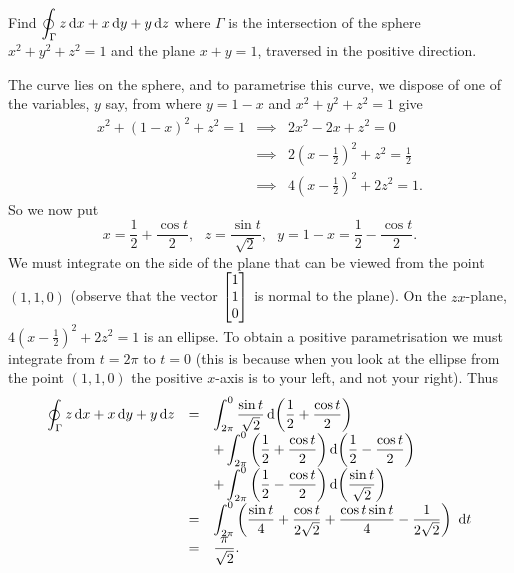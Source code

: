 \begin{multicols}{2}
\begin{problem}
\begin{answer}
\end{answer}
\end{problem}
\begin{problem}
Find $\doint _\Gamma  z\d{x} + x\d{y} + y\d{z}$ where $\Gamma$ is the
intersection of the sphere $x^2 + y^2 + z^2 = 1$ and the plane $x +
y = 1$, traversed in the positive direction. \begin{answer} The
curve lies on the sphere, and to parametrise this curve, we dispose
of one of the variables, $y$ say, from where $y = 1-x$ and $x^2 +
y^2 + z^2 = 1$ give
$$\begin{array}{lll}x^2 + (1 - x)^2 + z^2 = 1  & \implies & 2x^2 -2x + z^2 = 0\\ & \implies & 2\left(x - \frac{1}{2}\right)^2   + z^2 = \frac{1}{2}\\
& \implies & 4\left(x - \frac{1}{2}\right)^2 + 2z^2 =
1.\end{array}$$ So we now put $$x = \frac{1}{2} +  \frac{\cos t}{2},
\ \ \ z = \dfrac{\sin t}{\sqrt{2}},\ \ \  y = 1 - x =
\frac{1}{2}-\frac{\cos t}{2}.
$$We must integrate on the side of the plane that can be viewed
from   the point $(1,1,0)$ (observe that the vector  $\begin{bmatrix} 1\\ 1 \\
0 \end{bmatrix}$ is normal to the plane). On the $zx$-plane, $4\left(x -
\frac{1}{2}\right)^2 + 2z^2 = 1$ is an ellipse. To obtain a positive
parametrisation we must integrate from $t = 2\pi$ to $t = 0$ (this
is because when you look at the ellipse from the point $(1,1,0)$ the
positive $x$-axis is to your left, and not your right).   Thus
$$\begin{array}{lll}\doint _\Gamma  z\d{x} + x\d{y} + y\d{z} & = &
\dint ^0 _{2\pi} \dfrac{\sin
t}{\sqrt{2}} \d{\left( \frac{1}{2} + \frac{\cos t}{2}\right)}  \\
& & + \dint ^0 _{2\pi} \left( \frac{1}{2} + \frac{\cos
t}{2}\right)\d{\left(\frac{1}{2} -\frac{\cos t}{2}\right)} \\ & & +
\dint ^0 _{2\pi} \left(\frac{1}{2} -\frac{\cos
t}{2}\right)\d{\left(\dfrac{\sin t}{\sqrt{2}}\right)} \\
& = & \dint ^0 _{2\pi} \left(\frac{\sin t}{4}+ \frac{\cos
t}{2\sqrt{2}}+ \frac{\cos t\sin t}{4}  -
\frac{1}{2\sqrt{2}}\right)\ \d{t}  \\
& = & \dfrac{\pi}{\sqrt{2}}.
\end{array}$$

\end{answer}
\end{problem}

\end{multicols}



